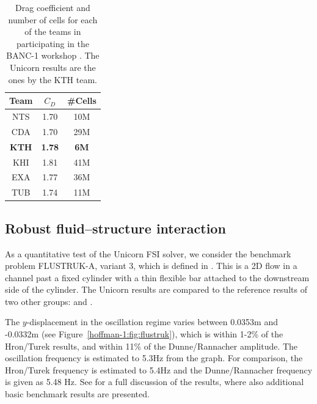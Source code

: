 \begin{table}
  \centering
    \begin{tabular}{ccc}
      \toprule
      Team & $C_D$ & \#Cells \\
      \midrule
      NTS &    1.70 &    10M \\
      CDA  &   1.70  &   29M \\
      \textbf{KTH}  &   \textbf{1.78}  &   \textbf{6M}\\
      KHI  &   1.81  &   41M \\
      EXA  &   1.77  &   36M \\
      TUB  &   1.74  &   11M \\
      \bottomrule
    \end{tabular}
    \caption{Drag coefficient and number of cells for each of the
      teams in participating in the BANC-1 workshop
      \citep{SpalartMejia2011}. The Unicorn results are the ones by
      the KTH team.}
  \label{hoffman-1:tab:hoffman-1-rlg}
\end{table}

\subsection{Robust fluid--structure interaction}

As a quantitative test of the Unicorn FSI solver, we consider
the benchmark problem FLUSTRUK-A, variant 3, which is defined in
\citet{HronTurek2005}. This is a 2D flow in a channel past a fixed
cylinder with a thin flexible bar attached to the downstream side of the
cylinder. The Unicorn results are compared to the reference results of
two other groups: \citet{HronTurek2005} and \citet{DunneRannacher2006}.

The $y$-displacement in the oscillation regime varies between 0.0353m
and -0.0332m (see Figure~\ref{hoffman-1:fig:flustruk}), which is within 1-2\% of
the Hron/Turek results, and within 11\% of the Dunne/Rannacher
amplitude. The oscillation frequency is estimated to 5.3Hz from the
graph. For comparison, the Hron/Turek frequency is estimated to 5.4Hz
and the Dunne/Rannacher frequency is given as 5.48 Hz. See
\citet{HoffmanJanssonStockli2011} for a full discussion of the
results, where also additional basic benchmark results are presented.

